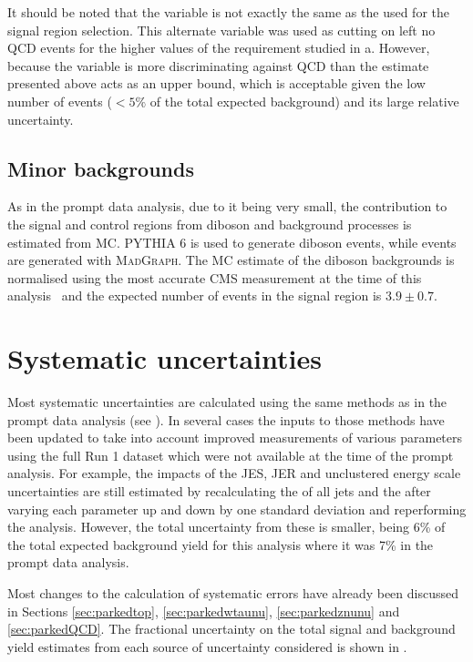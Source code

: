 It should be noted that the \jetmetdphileading variable is not exactly the same as the \jetmetdphi used for the signal region selection. This alternate variable was used as cutting on \jetmetdphi left no \ac{QCD} events for the higher values of the requirement studied in a. However, because the \jetmetdphi variable is more discriminating against \ac{QCD} than \jetmetdphileading the estimate presented above acts as an upper bound, which is acceptable given the low number of events ($<5\%$ of the total expected background) and its large relative uncertainty.


\subsection{Minor backgrounds}
\label{sec:parkedminor}
As in the prompt data analysis, due to it being very small, the contribution to the signal and control regions from diboson and \Zmumu background processes is estimated from \ac{MC}. \textsc{PYTHIA 6} is used to generate diboson events, while \Zmumu events are generated with \textsc{MadGraph}. The \ac{MC} estimate of the diboson backgrounds is normalised using the most accurate CMS measurement at the time of this analysis~\cite{Chatrchyan2013190} and the expected number of events in the signal region is $3.9\pm 0.7$.

\section{Systematic uncertainties}
\label{sec:parkedsyst}
Most systematic uncertainties are calculated using the same methods as in the prompt data analysis (see ). In several cases the inputs to those methods have been updated to take into account improved measurements of various parameters using the full Run 1 dataset which were not available at the time of the prompt analysis. For example, the impacts of the \ac{JES}, \ac{JER} and unclustered energy scale uncertainties are still estimated by recalculating the \pt of all jets and the \MET after varying each parameter up and down by one standard deviation and reperforming the analysis. However, the total uncertainty from these is smaller, being 6\% of the total expected background yield for this analysis where it was 7\% in the prompt data analysis.

Most changes to the calculation of systematic errors have already been discussed in Sections \ref{sec:parkedtop}, \ref{sec:parkedwtaunu}, \ref{sec:parkedznunu} and \ref{sec:parkedQCD}. The fractional uncertainty on the total signal and background yield estimates from each source of uncertainty considered is shown in .

